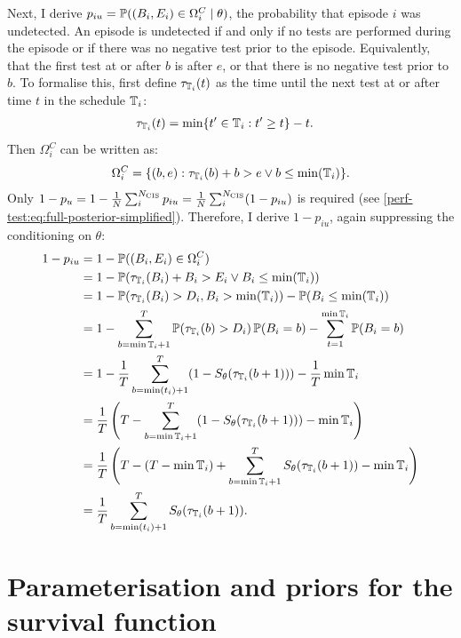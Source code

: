 \documentclass[thesis.tex]{subfiles}
\begin{document}
Next, I derive $p_{iu} = \operatorname{\mathbb{P}}((B_i, E_i) \in \Omega^C_i \mid \theta)$, the probability that episode $i$ was undetected.
An episode is undetected if and only if no tests are performed during the episode or if there was no negative test prior to the episode.
Equivalently, that the first test at or after $b$ is after $e$, or that there is no negative test prior to $b$.
To formalise this, first define $\tau_{\mathbb{T}_i}(t)$ as the time until the next test at or after time $t$ in the schedule $\mathbb{T}_i$:
\begin{align}
\tau_{\mathbb{T}_i}(t) &= \min \{ t' \in \mathbb{T}_i : t' \geq t \} - t.
\end{align}
Then $\Omega^C_i$ can be written as:
\begin{align}
\Omega_i^C = \{ (b, e) : \tau_{\mathbb{T}_i}(b) + b > e \vee b \leq \min(\mathbb{T}_i) \}.
\end{align}
Only $1 - p_u = 1 - \frac{1}{N} \sum_i^{N_\text{CIS}} p_{iu} = \frac{1}{N} \sum_i^{N_\text{CIS}} (1 - p_{iu})$ is required (see \cref{perf-test:eq:full-posterior-simplified}).
Therefore, I derive $1 - p_{iu}$, again suppressing the conditioning on $\theta$:
\begin{align}
1 - p_{iu}
&= 1 - \operatorname{\mathbb{P}}((B_i, E_i) \in \Omega^C_i) \\
&= 1 - \operatorname{\mathbb{P}}( \tau_{\mathbb{T}_i}(B_i) + B_i > E_i \vee B_i \leq \min(\mathbb{T}_i) ) \\
&= 1 - \operatorname{\mathbb{P}}( \tau_{\mathbb{T}_i}(B_i) > D_i , B_i > \min(\mathbb{T}_i) )  - \operatorname{\mathbb{P}}( B_i \leq \min(\mathbb{T}_i) ) \\
&= 1 - \sum_{b={\min\mathbb{T}_i} + 1}^T \operatorname{\mathbb{P}}( \tau_{\mathbb{T}_i}(b) > D_i) \operatorname{\mathbb{P}}(B_i = b) - \sum_{t=1}^{\min\mathbb{T}_i} \operatorname{\mathbb{P}}(B_i = b)\\
&= 1 - \frac{1}{T} \sum_{b=\min(t_i)+1}^T (1 - S_\theta(\tau_{\mathbb{T}_i}(b + 1))) - \frac{1}{T} \min\mathbb{T}_i \\
&= \frac{1}{T} \left(T - \sum_{b=\min\mathbb{T}_i+1}^T (1 - S_\theta(\tau_{\mathbb{T}_i}(b + 1))) - \min\mathbb{T}_i \right) \\
&= \frac{1}{T} \left(T - (T - \min\mathbb{T}_i) + \sum_{b=\min\mathbb{T}_i+1}^T S_\theta(\tau_{\mathbb{T}_i}(b + 1)) - \min\mathbb{T}_i \right) \\
&= \frac{1}{T} \sum_{b=\min(t_i)+1}^T S_\theta(\tau_{\mathbb{T}_i}(b + 1)).
\end{align}


\section{Parameterisation and priors for the survival function} \label{perf-test:sec:parameters-priors}
\end{document}
